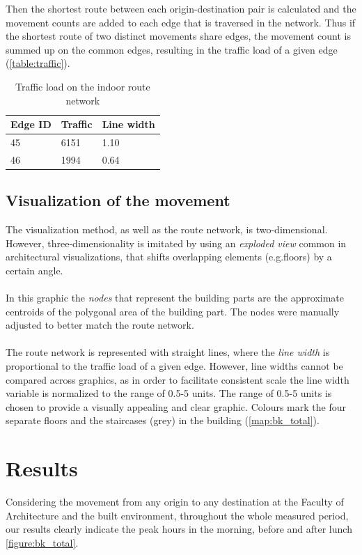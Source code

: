 Then the shortest route between each origin-destination pair is calculated and the movement counts are added to each edge that is traversed in the network.
Thus if the shortest route of two distinct movements share edges, the movement count is summed up on the common edges, resulting in the traffic load of a given edge (\autoref{table:traffic}).

\begin{table}[H]
\centering
\captionsetup{justification=centering}
\caption{Traffic load on the indoor route network}
\label{table:traffic}
\begin{tabular}{@{}lll@{}}
\toprule
Edge ID & Traffic & Line width \\ \midrule
45      & 6151    & 1.10       \\
46      & 1994    & 0.64       \\ \bottomrule
\end{tabular}
\end{table}


\subsection{Visualization of the movement}
The visualization method, as well as the route network, is two-dimensional. However, three-dimensionality is imitated by using an \textit{exploded view}
common in architectural visualizations, that shifts overlapping elements (e.g.floors) by a certain angle.
\\\\
In this graphic the \textit{nodes} that represent the building parts are the approximate centroids of the polygonal area of the building part. The nodes were 
manually adjusted to better match the route network.
\\\\
The route network is represented with straight lines, where the \textit{line width} is proportional to the traffic load of a given edge. However, line widths cannot be compared across graphics, as in order to facilitate consistent scale the line width variable is normalized to the range of 0.5-5 units. The range of 0.5-5 units is chosen to provide a visually appealing and clear graphic. Colours mark the four separate floors and the staircases (grey) in the building (\autoref{map:bk_total}).

\section{Results}
Considering the movement from any origin to any destination at the Faculty of Architecture and the built environment, throughout the whole measured period, our results clearly indicate the peak hours in the morning, before and after lunch \autoref{figure:bk_total}.

